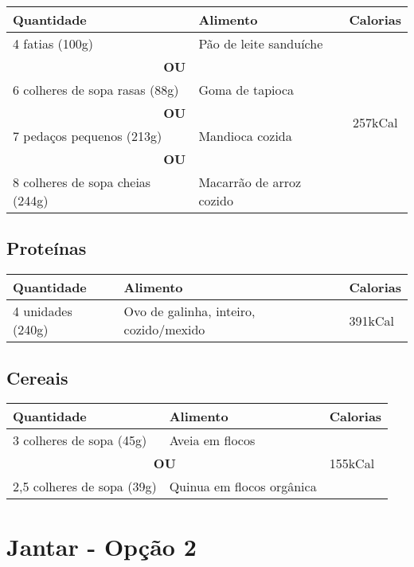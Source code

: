 \begin{tabular}{p{8cm}p{8cm}c}
\toprule
\textbf{Quantidade} & \textbf{Alimento} & \textbf{Calorias} \\
\midrule
4 fatias (100g) & Pão de leite sanduíche & \multirow{8}{*}{257kCal} \\
\cmidrule(lr){1-2}
\multicolumn{2}{c}{\textbf{OU}} \\
\cmidrule(lr){1-2}
6 colheres de sopa rasas (88g) & Goma de tapioca & \\
\cmidrule(lr){1-2}
\multicolumn{2}{c}{\textbf{OU}} \\
\cmidrule(lr){1-2}
7 pedaços pequenos (213g) & Mandioca cozida & \\
\cmidrule(lr){1-2}
\multicolumn{2}{c}{\textbf{OU}} \\
\cmidrule(lr){1-2}
8 colheres de sopa cheias (244g) & Macarrão de arroz cozido & \\
\bottomrule
\end{tabular}

\subsection*{Proteínas}
\begin{tabular}{p{8cm}p{8cm}p{1.5cm}}
\toprule
\textbf{Quantidade} & \textbf{Alimento} & \textbf{Calorias} \\
\midrule
4 unidades (240g) & Ovo de galinha, inteiro, cozido/mexido & 391kCal \\
\bottomrule
\end{tabular}

\subsection*{Cereais}
\begin{tabular}{p{8cm}p{8cm}p{1.5cm}}
\toprule
\textbf{Quantidade} & \textbf{Alimento} & \textbf{Calorias} \\
\midrule
3 colheres de sopa (45g) & Aveia em flocos & \multirow{4}{*}{155kCal} \\
\cmidrule(lr){1-2}
\multicolumn{2}{c}{\textbf{OU}} \\
\cmidrule(lr){1-2}
2,5 colheres de sopa (39g) & Quinua em flocos orgânica \\
\bottomrule
\end{tabular}

\section*{Jantar - Opção 2}

